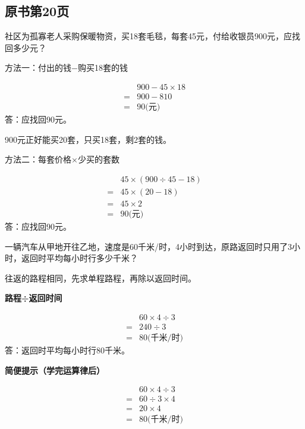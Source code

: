 \subsection*{原书第20页}

社区为孤寡老人采购保暖物资，买18套毛毯，每套45元，付给收银员900元，应找回多少元？\par
\begin{BookAnswer}
方法一：付出的钱−购买18套的钱\par \[\begin{aligned} &900-45\times18\\={}&900-810\\={}&90\text{(元)}\end{aligned}\]答：应找回90元。\par 900元正好能买20套，只买18套，剩2套的钱。\par 方法二：每套价格×少买的套数\par \[\begin{aligned} &45\times(900\div45-18)\\={}&45\times(20-18)\\={}&45\times2\\={}&90\text{(元)}\end{aligned}\]答：应找回90元。\par
\end{BookAnswer}

一辆汽车从甲地开往乙地，速度是60千米/时，4小时到达，原路返回时只用了3小时，返回时平均每小时行多少千米？\par
\begin{BookAnswer}
往返的路程相同，先求单程路程，再除以返回时间。\par \textbf{路程÷返回时间}\par \[\begin{aligned} &60\times4\div3\\={}&240\div3\\={}&80\text{(千米/时)}\end{aligned}\]答：返回时平均每小时行80千米。\par \par\textbf{简便提示（学完运算律后）}\par \[\begin{aligned}&60\times4\div3\\={}&60\div3\times4\\={}&20\times4\\={}&80\text{(千米/时)}\end{aligned}\]
\end{BookAnswer}

